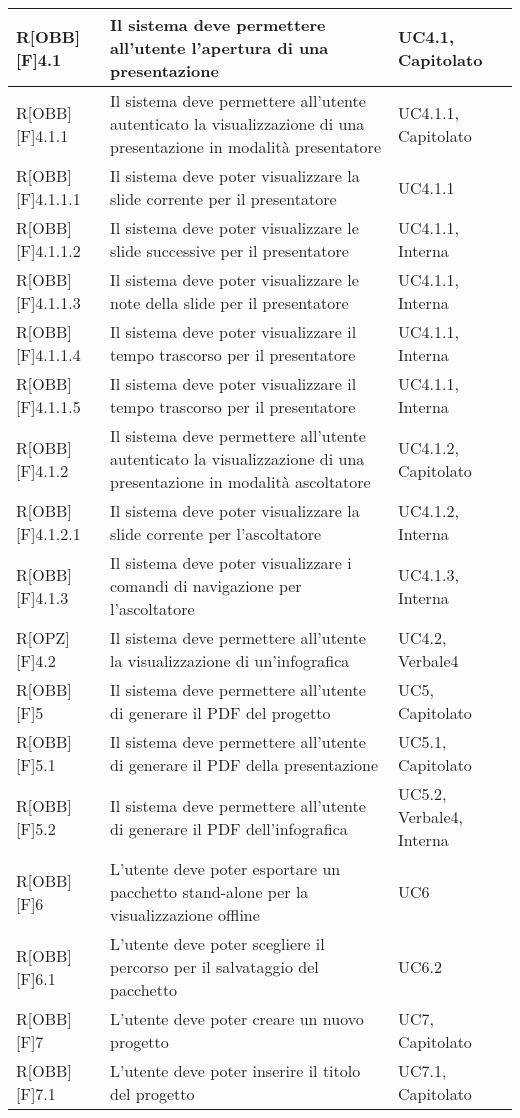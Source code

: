 	\begin{table}[h]
		\begin{tabular}{|p{}|p{}|p{}|}
			\midrule

			R[OBB][F]4.1 & Il sistema deve permettere all'utente l'apertura di una presentazione & UC4.1, Capitolato \\ \midrule
			R[OBB][F]4.1.1 & Il sistema deve permettere all'utente autenticato la visualizzazione di una presentazione in modalità presentatore & UC4.1.1, Capitolato \\ \midrule
			R[OBB][F]4.1.1.1 & Il sistema deve poter visualizzare la slide corrente per il presentatore & UC4.1.1 \\ \midrule
			R[OBB][F]4.1.1.2 & Il sistema deve poter visualizzare le slide successive per il presentatore & UC4.1.1, Interna \\ \midrule
			R[OBB][F]4.1.1.3 & Il sistema deve poter visualizzare le note della slide per il presentatore & UC4.1.1, Interna \\ \midrule
			R[OBB][F]4.1.1.4 & Il sistema deve poter visualizzare il tempo trascorso per il presentatore & UC4.1.1, Interna \\ \midrule
			R[OBB][F]4.1.1.5 & Il sistema deve poter visualizzare il tempo trascorso per il presentatore & UC4.1.1, Interna \\ \midrule
			R[OBB][F]4.1.2 & Il sistema deve permettere all'utente autenticato la visualizzazione di una presentazione in modalità ascoltatore & UC4.1.2, Capitolato \\ \midrule
			R[OBB][F]4.1.2.1 & Il sistema deve poter visualizzare la slide corrente per l'ascoltatore & UC4.1.2, Interna \\ \midrule
			R[OBB][F]4.1.3 & Il sistema deve poter visualizzare i comandi di navigazione per l'ascoltatore & UC4.1.3, Interna \\ \midrule
			R[OPZ][F]4.2 & Il sistema deve permettere all'utente la visualizzazione di un'\gls{infografica} & UC4.2, Verbale4 \\ \midrule
			R[OBB][F]5 & Il sistema deve permettere all'utente di generare il PDF del progetto & UC5, Capitolato \\ \midrule
			R[OBB][F]5.1 & Il sistema deve permettere all'utente di generare il PDF della presentazione & UC5.1, Capitolato \\ \midrule
			R[OBB][F]5.2 & Il sistema deve permettere all'utente di generare il PDF dell'\gls{infografica} & UC5.2, Verbale4, Interna \\ \midrule
			R[OBB][F]6 & L'utente deve poter esportare un pacchetto stand-alone per la visualizzazione offline & UC6 \\ \midrule
			R[OBB][F]6.1 & L'utente deve poter scegliere il percorso per il salvataggio del pacchetto & UC6.2 \\ \midrule
			R[OBB][F]7 & L'utente deve poter creare un nuovo progetto & UC7, Capitolato \\ \midrule
			R[OBB][F]7.1 & L'utente deve poter inserire il titolo del progetto & UC7.1, Capitolato \\ \midrule

		\end{tabular}
	\end{table}
